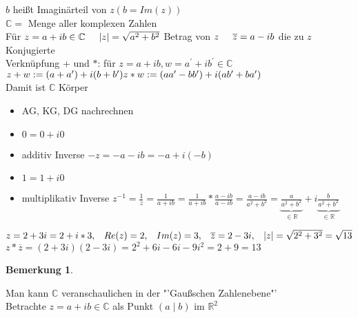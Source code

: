 \documentclass[a4paper,11pt]{article}
\newtheorem{bem}[definition]{Bemerkung}
\begin{document}
$b$ heißt Imaginärteil von $z (b=Im(z))$ \\
$\mathbb{C}=$ Menge aller komplexen Zahlen \\
Für $z=a+ib\in\mathbb{C}\hspace{5mm}\vert z\vert=\sqrt{a^2+b^2}$ Betrag von $z\hspace{5mm}\overline{z}=a-ib$ die zu $z$ Konjugierte \\
Verknüpfung $+$ und $*$: für $z=a+ib, w=a^{\prime}+ib^{\prime}\in\mathbb{C}$ \\
$z+w:=(a+a^{\prime})+i(b+b^{\prime}) \\
z*w:=(aa^{\prime}-bb^{\prime})+i(ab^{\prime}+ba^{\prime})$ \\
Damit ist $\mathbb{C}$ Körper \\
\begin{itemize}
\vspace{-5mm}
\item AG, KG, DG nachrechnen
\item $0=0+i0$
\item additiv Inverse $-z=-a-ib=-a+i(-b)$
\item $1=1+i0$
\item multiplikativ Inverse $z^{-1}=\frac{1}{z}=\frac{1}{a+ib}=\frac{1}{a+ib}*\frac{a-ib}{a-ib}=\frac{a-ib}{a^2+b^2}=\underbrace{\frac{a}{a^2+b^2}}_{\in\mathbb{R}}+i\underbrace{\frac{b}{a^2+b^2}}_{\in\mathbb{R}}$
\end{itemize}
$z=2+3i=2+i*3,\hspace{3mm}Re(z)=2,\hspace{3mm}Im(z)=3,\hspace{3mm}\overline{z}=2-3i,\hspace{3mm}\vert z\vert=\sqrt{2^2+3^2}=\sqrt{13}$ \\
$z*\overline{z}=(2+3i)(2-3i)=2^2+6i-6i-9i^2=2+9=13$
\begin{bem}
\end{bem}
Man kann $\mathbb{C}$ veranschaulichen in der "'Gaußschen Zahlenebene"' \\
Betrachte $z=a+ib\in\mathbb{C}$ als Punkt $(a\mid b)$ im $\mathbb{R}^2$
\newpage
\end{document}
